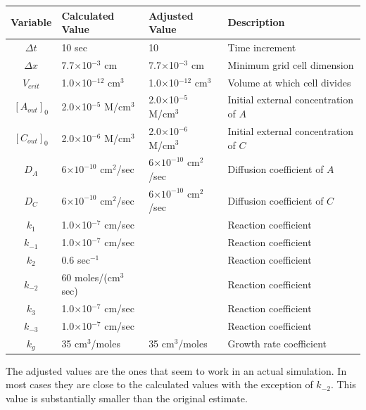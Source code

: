 \documentclass[12pt]{article}
\begin{document}
\begin{tabular}{|c|l|l|l|}
\hline
Variable & Calculated Value & Adjusted Value & Description \\
\hline
$\Delta t$ & 10 sec & 10 & Time increment \\
$\Delta x$ & 7.7$\times$10$^{-3}$ cm & 7.7$\times$10$^{-3}$ cm& Minimum grid cell dimension \\
$V_{crit}$ & 1.0$\times$10$^{-12}$ cm$^3$ & 1.0$\times$10$^{-12}$ cm$^3$
    &  Volume at which cell divides \\
$[A_{out}]_0$ & 2.0$\times$10$^{-5}$ M/cm$^3$ & 2.0$\times$10$^{-5}$ M/cm$^3$
    & Initial external concentration of $A$ \\
$[C_{out}]_0$ & 2.0$\times$10$^{-6}$ M/cm$^3$ & 2.0$\times$10$^{-6}$ M/cm$^3$
    & Initial external concentration of $C$ \\
$D_A$ & 6$\times 10^{-10}$ cm$^2$/sec & 6$\times 10^{-10}$ cm$^2$/sec & Diffusion coefficient of $A$ \\
$D_C$ & 6$\times 10^{-10}$ cm$^2$/sec & 6$\times 10^{-10}$ cm$^2$/sec & Diffusion coefficient of $C$ \\
$k_1$ & 1.0$\times$10$^{-7}$ cm/sec &\color{red}{5.0$\times$10$^{-6}$ cm/sec} & Reaction coefficient \\
$k_{-1}$ & 1.0$\times$10$^{-7}$ cm/sec &\color{red}{5.0$\times$10$^{-6}$ cm/sec} & Reaction coefficient \\
$k_2$ & 0.6 sec$^{-1}$ &\color{red}{0.2 sec$^{-1}$} & Reaction coefficient \\
$k_{-2}$ & 60 moles/(cm$^3$ sec) &\color{red}{0.06 moles/(cm$^3$ sec)} & Reaction coefficient \\
$k_3$ & 1.0$\times$10$^{-7}$ cm/sec &\color{red}{1.0$\times$10$^{-6}$ cm/sec} & Reaction coefficient \\
$k_{-3}$ & 1.0$\times$10$^{-7}$ cm/sec &\color{red}{1.0$\times$10$^{-6}$ cm/sec} & Reaction coefficient \\
$k_g$ & 35 cm$^3$/moles & 35 cm$^3$/moles & Growth rate coefficient \\
\hline
\end{tabular}

\noindent
The adjusted values are the ones that seem to work in an actual simulation. In most cases they are close
to the calculated values with the exception of $k_{-2}$. This value is substantially smaller than the
original estimate.
\end{document}
